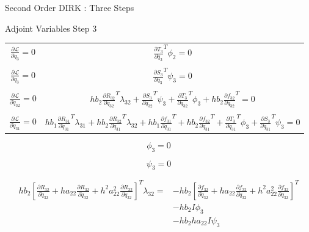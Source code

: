 \documentclass{beamer}
\newcommand{\pd}[2]{\frac{\partial #1}{\partial #2}}
\begin{document}
\begin{frame}[allowframebreaks]{Second Order DIRK : Three Steps}
\framebreak

\begin{block}{Adjoint Variables Step 3}
  \begin{table}[h]
    \centering
    \label{adjoint_step3}
    \begin{tabular}{c|c}
      $\pd{{\mathcal L}}{\dot{q}_{3}}  = 0$  & $ \pd{{T_3}}{\dot{q}_{3}}^T \phi_2 = 0$  \\
      &\\
      $\pd{{\mathcal L}}{{q}_{3}}  = 0$      & $\pd{S_3}{q_3}^T \psi_3 = 0$ \\
      &\\
      $\pd{{\mathcal L}}{\ddot{q}_{32}} = 0$ & $hb_2\pd{R_{32}}{\ddot{q}_{32}}^T\lambda_{32}+ \pd{S_3}{\ddot{q}_{32}}^T \psi_3 + \pd{T_3}{\ddot{q}_{32}}^T \phi_3 + hb_2\pd{f_{32}}{\ddot{q}_{32}}^T = 0$ \\
      &\\
      $\pd{{\mathcal L}}{\ddot{q}_{31}} = 0$ &   $ h b_1 \pd{R_{31}}{\ddot{q}_{31}}^T \lambda_{31} +  h b_2 \pd{R_{32}}{\ddot{q}_{31}}^T \lambda_{32} +  h b_1 \pd{f_{31}}{\ddot{q}_{31}}^T +  h b_2 \pd{f_{32}}{\ddot{q}_{31}}^T  + \pd{T_3}{\ddot{q}_{31}}^T \phi_3 + \pd{S_3}{\ddot{q}_{31}}^T \psi_3 = 0  $ \\
    \end{tabular}
  \end{table}
\end{block}

\framebreak

\begin{equation}
  \phi_3 = 0
\end{equation}

\begin{equation}
  \psi_3 = 0
\end{equation}

\begin{equation}
  \begin{split}
    hb_2\left[\pd{R_{32}}{\ddot{q}_{32}} + ha_{22}\pd{R_{32}}{\dot{q}_{32}} + h^2a_{22}^2 \pd{R_{32}}{{q}_{32}} \right]^T \lambda_{32} = & - hb_2 \left[\pd{f_{32}}{\ddot{q}_{32}} + ha_{22}\pd{f_{32}}{\dot{q}_{32}} + h^2a_{22}^2 \pd{f_{32}}{{q}_{32}} \right]^T \\ 
    & - hb_2 I \phi_3 \\ 
    & - hb_2ha_{22} I  \psi_3
  \end{split}
\end{equation}


\end{frame}
\end{document}
